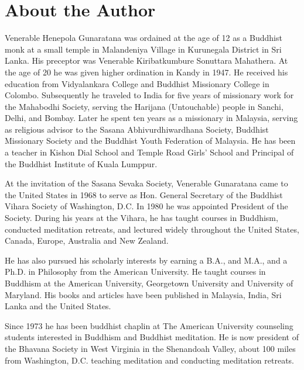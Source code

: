 \section*{About the Author}

Venerable Henepola Gunaratana was ordained at the age of 12 as a Buddhist monk
at a small temple in Malandeniya Village in Kurunegala District in Sri Lanka.
His preceptor was Venerable Kiribatkumbure Sonuttara Mahathera. At the age of 20
he was given higher ordination in Kandy in 1947. He received his education from
Vidyalankara College and Buddhist Missionary College in Colombo. Subsequently he
traveled to India for five years of missionary work for the Mahabodhi Society,
serving the Harijana (Untouchable) people in Sanchi, Delhi, and Bombay. Later he
spent ten years as a missionary in Malaysia, serving as religious advisor to the
Sasana Abhivurdhiwardhana Society, Buddhist Missionary Society and the Buddhist
Youth Federation of Malaysia. He has been a teacher in Kishon Dial School and
Temple Road Girls' School and Principal of the Buddhist Institute of Kuala
Lumppur.

At the invitation of the Sasana Sevaka Society, Venerable Gunaratana came to the
United States in 1968 to serve as Hon. General Secretary of the Buddhist Vihara
Society of Washington, D.C. In 1980 he was appointed President of the Society.
During his years at the Vihara, he has taught courses in Buddhism, conducted
meditation retreats, and lectured widely throughout the United States, Canada,
Europe, Australia and New Zealand.

He has also pursued his scholarly interests by earning a B.A., and M.A., and a
Ph.D. in Philosophy from the American University. He taught courses in Buddhism
at the American University, Georgetown University and University of Maryland.
His books and articles have been published in Malaysia, India, Sri Lanka and the
United States.

Since 1973 he has been buddhist chaplin at The American University counseling
students interested in Buddhism and Buddhist meditation. He is now president of
the Bhavana Society in West Virginia in the Shenandoah Valley, about 100 miles
from Washington, D.C. teaching meditation and conducting meditation retreats.

